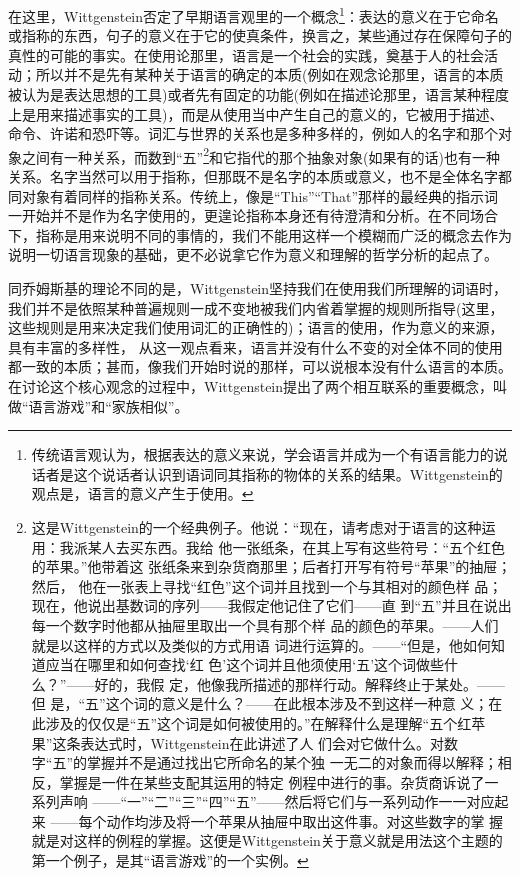 \documentclass{article}
\begin{document}
在这里，Wittgenstein否定了早期语言观里的一个概念\footnote{传统语言观认为，根据表达的意义来说，学会语言并成为一个有语言能力的说话者是这个说话者认识到语词同其指称的物体的关系的结果。Wittgenstein的观点是，语言的意义产生于使用。}：表达的意义在于它命名或指称的东西，句子的意义在于它的使真条件，换言之，某些通过存在保障句子的真性的可能的事实。在使用论那里，语言是一个社会的实践，奠基于人的社会活动；所以并不是先有某种关于语言的确定的本质(例如在观念论那里，语言的本质被认为是表达思想的工具)或者先有固定的功能(例如在描述论那里，语言某种程度上是用来描述事实的工具)，而是从使用当中产生自己的意义的，它被用于描述、命令、许诺和恐吓等。词汇与世界的关系也是多种多样的，例如人的名字和那个对象之间有一种关系，而数到“五”\footnote{这是Wittgenstein的一个经典例子。他说：“现在，请考虑对于语言的这种运用：我派某人去买东西。我给 他一张纸条，在其上写有这些符号：“五个红色的苹果。”他带着这 张纸条来到杂货商那里；后者打开写有符号“苹果”的抽屉；然后， 他在一张表上寻找“红色”这个词并且找到一个与其相对的颜色样 品；现在，他说出基数词的序列——我假定他记住了它们——直 到“五”并且在说出每一个数字时他都从抽屉里取出一个具有那个样 品的颜色的苹果。——人们就是以这样的方式以及类似的方式用语 词进行运算的。——“但是，他如何知道应当在哪里和如何查找‘红 色’这个词并且他须使用‘五’这个词做些什么？”——好的，我假 定，他像我所描述的那样行动。解释终止于某处。——但 是，“五”这个词的意义是什么？——在此根本涉及不到这样一种意 义；在此涉及的仅仅是“五”这个词是如何被使用的。”在解释什么是理解“五个红苹果”这条表达式时，Wittgenstein在此讲述了人 们会对它做什么。对数字“五”的掌握并不是通过找出它所命名的某个独 一无二的对象而得以解释；相反，掌握是一件在某些支配其运用的特定 例程中进行的事。杂货商诉说了一系列声响 ——“一”“二”“三”“四”“五”——然后将它们与一系列动作一一对应起来 ——每个动作均涉及将一个苹果从抽屉中取出这件事。对这些数字的掌 握就是对这样的例程的掌握。这便是Wittgenstein关于意义就是用法这个主题的第一个例子，是其“语言游戏”的一个实例。}和它指代的那个抽象对象(如果有的话)也有一种关系。名字当然可以用于指称，但那既不是名字的本质或意义，也不是全体名字都同对象有着同样的指称关系。传统上，像是“This”“That”那样的最经典的指示词一开始并不是作为名字使用的，更遑论指称本身还有待澄清和分析。在不同场合下，指称是用来说明不同的事情的，我们不能用这样一个模糊而广泛的概念去作为说明一切语言现象的基础，更不必说拿它作为意义和理解的哲学分析的起点了。

同乔姆斯基的理论不同的是，Wittgenstein坚持我们在使用我们所理解的词语时，我们并不是依照某种普遍规则一成不变地被我们内省着掌握的规则所指导(这里，这些规则是用来决定我们使用词汇的正确性的)；语言的使用，作为意义的来源，具有丰富的多样性， 从这一观点看来，语言并没有什么不变的对全体不同的使用都一致的本质；甚而，像我们开始时说的那样，可以说根本没有什么语言的本质。在讨论这个核心观念的过程中，Wittgenstein提出了两个相互联系的重要概念，叫做“语言游戏”和“家族相似”。
\end{document}
